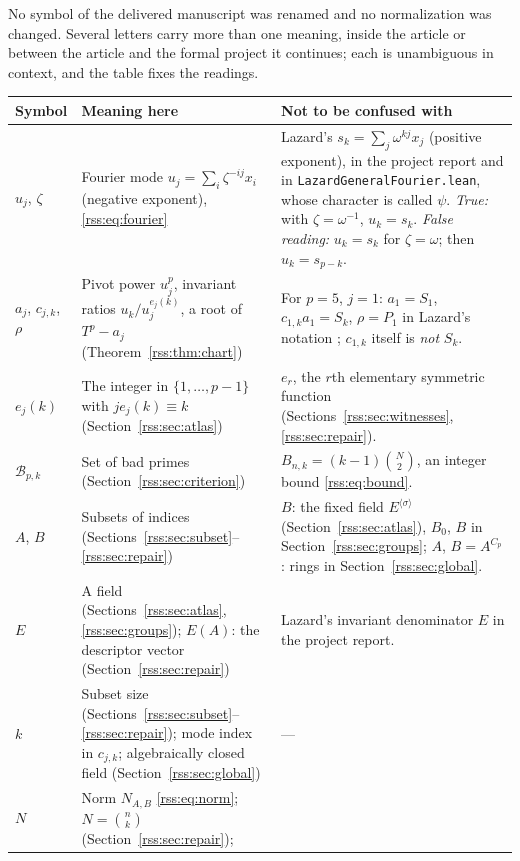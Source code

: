 \documentclass[11pt,a4paper]{article}
\theoremstyle{definition}
\theoremstyle{remark}
\newcommand{\code}[1]{{\small\nolinkurl{#1}}}
\begin{document}
No symbol of the delivered manuscript was renamed and no normalization was
changed. Several letters carry more than one meaning, inside the article or
between the article and the formal project it continues; each is
unambiguous in context, and the table fixes the readings.

\begin{center}
\small
\begin{tabularx}{\textwidth}{@{}L{0.14\textwidth}>{\raggedright\arraybackslash}X>{\raggedright\arraybackslash}X@{}}
\toprule
Symbol & Meaning here & Not to be confused with\\
\midrule
$u_j$, $\zeta$ &
Fourier mode $u_j=\sum_i\zeta^{-ij}x_i$ (negative exponent),
\eqref{rss:eq:fourier} &
Lazard's $s_k=\sum_j\omega^{kj}x_j$ (positive exponent), in the project
report and in \code{LazardGeneralFourier.lean}, whose character is called
$\psi$. \emph{True:} with $\zeta=\omega^{-1}$, $u_k=s_k$.
\emph{False reading:} $u_k=s_k$ for $\zeta=\omega$; then $u_k=s_{p-k}$.\\
$a_j$, $c_{j,k}$, $\rho$ &
Pivot power $u_j^p$, invariant ratios $u_k/u_j^{e_j(k)}$, a root of
$T^p-a_j$ (Theorem~\ref{rss:thm:chart}) &
For $p=5$, $j=1$: $a_1=S_1$, $c_{1,k}a_1=S_k$, $\rho=P_1$ in Lazard's
notation \cite{repoReport}; $c_{1,k}$ itself is \emph{not} $S_k$.\\
$e_j(k)$ &
The integer in $\{1,\dots,p-1\}$ with $je_j(k)\equiv k$ (Section~\ref{rss:sec:atlas}) &
$e_r$, the $r$th elementary symmetric function (Sections~\ref{rss:sec:witnesses}, \ref{rss:sec:repair}).\\
$\mathcal B_{p,k}$ &
Set of bad primes (Section~\ref{rss:sec:criterion}) &
$B_{n,k}=(k-1)\binom N2$, an integer bound \eqref{rss:eq:bound}.\\
$A$, $B$ &
Subsets of indices (Sections~\ref{rss:sec:subset}--\ref{rss:sec:repair}) &
$B$: the fixed field $E^{\langle\sigma\rangle}$ (Section~\ref{rss:sec:atlas}),
$B_0$, $B$ in Section~\ref{rss:sec:groups}; $A$, $B=A^{C_p}$: rings in
Section~\ref{rss:sec:global}.\\
$E$ &
A field (Sections~\ref{rss:sec:atlas}, \ref{rss:sec:groups}); $E(A)$: the
descriptor vector (Section~\ref{rss:sec:repair}) &
Lazard's invariant denominator $E$ in the project report.\\
$k$ &
Subset size (Sections~\ref{rss:sec:subset}--\ref{rss:sec:repair}); mode index
in $c_{j,k}$; algebraically closed field (Section~\ref{rss:sec:global}) & ---\\
$N$ &
Norm $N_{A,B}$ \eqref{rss:eq:norm}; $N=\binom nk$ (Section~\ref{rss:sec:repair});

\end{tabularx}
\end{center}
\end{document}
